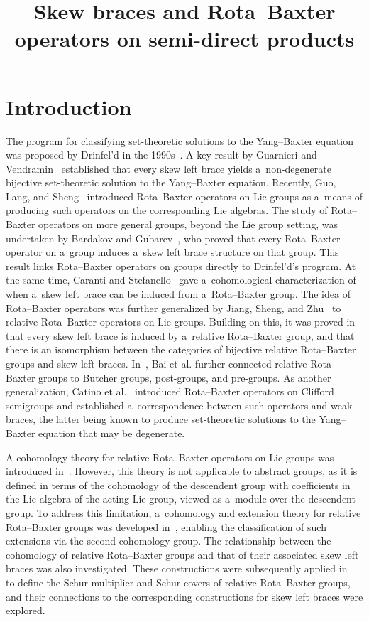 \documentclass{jonasart}
\title{Skew braces and Rota--Baxter operators on semi-direct products}
\theoremstyle{plain}
\begin{document}
	
	\section{Introduction}
	
	The program for classifying set-theoretic solutions to the Yang--Baxter equation was proposed by Drinfel'd in the 1990s~\cite{MR1183474}. A key result by Guarnieri and Vendramin~\cite{MR3647970} established that every skew left brace yields a~non-degenerate bijective set-theoretic solution to the Yang--Baxter equation. Recently, Guo, Lang, and Sheng~\cite{MR4271483} introduced Rota--Baxter operators on Lie groups as a~means of producing such operators on the corresponding Lie algebras. The study of Rota--Baxter operators on more general groups, beyond the Lie group setting, was undertaken by Bardakov and Gubarev~\cite{MR4370524, MR4556953}, who proved that every Rota--Baxter operator on a~group induces a~skew left brace structure on that group. This result links Rota--Baxter operators on groups directly to Drinfel'd's program. At the same time, Caranti and Stefanello~\cite{MR4531710} gave a~cohomological characterization of when a~skew left brace can be induced from a~Rota--Baxter group. The idea of Rota--Baxter operators was further generalized by Jiang, Sheng, and Zhu~\cite{MR4704155} to relative Rota--Baxter operators on Lie groups. Building on this, it was proved in~\cite{MR4857550} that every skew left brace is induced by a~relative Rota--Baxter group, and that there is an isomorphism between the categories of bijective relative Rota--Baxter groups and skew left braces. In~\cite{MR4705761}, Bai et al. further connected relative Rota--Baxter groups to Butcher groups, post-groups, and pre-groups. As another generalization, Catino et al.~\cite{MR4412793, MR4551911} introduced Rota--Baxter operators on Clifford semigroups and established a~correspondence between such operators and weak braces, the latter being known to produce set-theoretic solutions to the Yang--Baxter equation that may be degenerate.
	
	A cohomology theory for relative Rota--Baxter operators on Lie groups was introduced in~\cite{MR4704155}. However, this theory is not applicable to abstract groups, as it is defined in terms of the cohomology of the descendent group with coefficients in the Lie algebra of the acting Lie group, viewed as a~module over the descendent group. To address this limitation, a~cohomology and extension theory for relative Rota--Baxter groups was developed in~\cite{MR4819014}, enabling the classification of such extensions via the second cohomology group. The relationship between the cohomology of relative Rota--Baxter groups and that of their associated skew left braces was also investigated. These constructions were subsequently applied in~\cite{MR4755474} to define the Schur multiplier and Schur covers of relative Rota--Baxter groups, and their connections to the corresponding constructions for skew left braces were explored.
	
\end{document}
